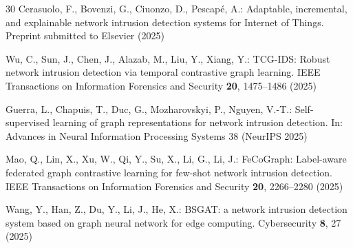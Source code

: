 \documentclass[twocolumn]{llncs}
\begin{document}
\begin{thebibliography}{30}
Cerasuolo, F., Bovenzi, G., Ciuonzo, D., Pescap{\'e}, A.: Adaptable, incremental, and explainable
network intrusion detection systems for Internet of Things. Preprint submitted to Elsevier (2025)

Wu, C., Sun, J., Chen, J., Alazab, M., Liu, Y., Xiang, Y.: TCG-IDS: Robust network intrusion
detection via temporal contrastive graph learning. IEEE Transactions on Information Forensics and
Security \textbf{20}, 1475--1486 (2025)

Guerra, L., Chapuis, T., Duc, G., Mozharovskyi, P., Nguyen, V.-T.: Self-supervised learning of graph
representations for network intrusion detection. In: Advances in Neural Information Processing
Systems 38 (NeurIPS 2025)

Mao, Q., Lin, X., Xu, W., Qi, Y., Su, X., Li, G., Li, J.: FeCoGraph: Label-aware federated graph
contrastive learning for few-shot network intrusion detection. IEEE Transactions on Information
Forensics and Security \textbf{20}, 2266--2280 (2025)

Wang, Y., Han, Z., Du, Y., Li, J., He, X.: BSGAT: a network intrusion detection system based on
graph neural network for edge computing. Cybersecurity \textbf{8}, 27 (2025)

\end{thebibliography}
\end{document}

